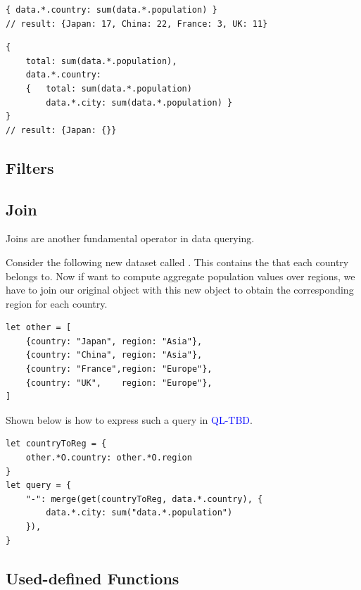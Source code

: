 \documentclass[runningheads]{llncs}
\newcommand{\lang}{\textcolor{blue}{QL-TBD}}
\begin{document}
\begin{lstlisting}[style=JavaScript, columns=flexible, numbers=none]
{ data.*.country: sum(data.*.population) }
// result: {Japan: 17, China: 22, France: 3, UK: 11}
\end{lstlisting}

\begin{lstlisting}[style=JavaScript, columns=flexible, numbers=none]
{ 
    total: sum(data.*.population),
    data.*.country:
    {   total: sum(data.*.population)
        data.*.city: sum(data.*.population) }
}
// result: {Japan: {}}
\end{lstlisting}


\subsection{Filters}

\subsection{Join}
Joins are another fundamental operator in data querying.

Consider the following new dataset called .
This contains the  that each country belongs to.
Now if want to compute aggregate population values over regions, we
have to join our original  object with this new object
to obtain the corresponding region for each country.

\begin{lstlisting}[style=JavaScript]
let other = [
    {country: "Japan", region: "Asia"},
    {country: "China", region: "Asia"},
    {country: "France",region: "Europe"},
    {country: "UK",    region: "Europe"},
]
\end{lstlisting}

Shown below is how to express such a query in \lang{}.

\begin{lstlisting}[style=JavaScript, columns=flexible]
let countryToReg = {
    other.*O.country: other.*O.region
}
let query = {
    "-": merge(get(countryToReg, data.*.country), {
        data.*.city: sum("data.*.population")
    }),
}
\end{lstlisting}


\subsection{Used-defined Functions}
\end{document}

